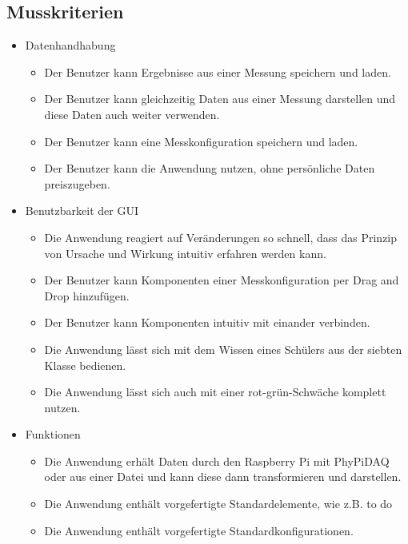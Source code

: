 \documentclass[parskip=full]{scrartcl}
\begin{document}
\subsection{Musskriterien}

\begin{itemize}

\item Datenhandhabung
\begin{itemize}

\item Der Benutzer kann Ergebnisse aus einer Messung speichern und laden.
\item Der Benutzer kann gleichzeitig Daten aus einer Messung darstellen und diese Daten auch weiter verwenden.
\item Der Benutzer kann eine Messkonfiguration speichern und laden.
\item Der Benutzer kann die Anwendung nutzen, ohne persönliche Daten preiszugeben.

\end{itemize}



\item Benutzbarkeit der GUI
\begin{itemize}

\item Die Anwendung reagiert auf Veränderungen so schnell, dass das Prinzip von Ursache und Wirkung intuitiv erfahren werden kann.
\item Der Benutzer kann Komponenten einer Messkonfiguration per Drag and Drop hinzufügen.
\item Der Benutzer kann Komponenten intuitiv mit einander verbinden.
\item Die Anwendung lässt sich mit dem Wissen eines Schülers aus der siebten Klasse bedienen.
\item Die Anwendung lässt sich auch mit einer rot-grün-Schwäche komplett nutzen.

\end{itemize}

\item Funktionen
\begin{itemize}

\item Die Anwendung erhält Daten durch den Raspberry Pi mit PhyPiDAQ oder aus einer Datei und kann diese dann transformieren und darstellen.
\item Die Anwendung enthält vorgefertigte Standardelemente, wie z.B. to do
\item Die Anwendung enthält vorgefertigte Standardkonfigurationen.


\end{itemize}
\end{itemize}
\end{document}
